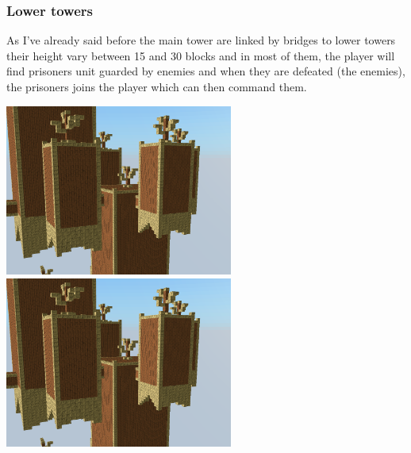 \documentclass[article]{report}         %
\begin{document}
        \subsubsection{Lower towers}
          As I've already said before the main tower are linked by bridges to lower towers their height vary between 15 and 30 blocks and in most of them, the player will find prisoners unit guarded by enemies and when they are defeated (the enemies), the prisoners joins the player which can then command them.
          \begin{center}
            \includegraphics[width=7.5cm]{images/DT/mediumTowers.png}
            \includegraphics[width=7.5cm]{images/DT/mediumTowers.png} %
          \end{center}
\end{document}
